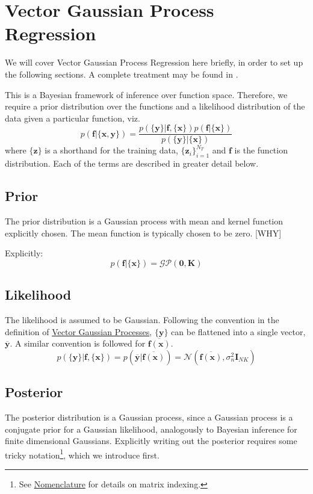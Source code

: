 \documentclass[12pt,a4paper,twoside]{report}
\theoremstyle{definition}
\begin{document}
\section{Vector Gaussian Process Regression}
We will cover Vector Gaussian Process Regression here briefly, in order to set up the following sections. A complete treatment may be found in \cite{alvarez}.

This is a Bayesian framework of inference over function space. Therefore, we require a prior distribution over the functions and a likelihood distribution of the data given a particular function, viz.
$$p(\mathbf f|\{\mathbf x,\mathbf y\}) = \frac{p(\{\mathbf y\}|\mathbf f,\{\mathbf x\})p(\mathbf f|\{\mathbf x\})}{p(\{\mathbf y\}|\{\mathbf x\})}$$
where $\{\mathbf z\}$ is a shorthand for the training data, $\{\mathbf z_i\}_{i=1}^{N_T}$ and $\mathbf f$ is the function distribution. Each of the terms are described in greater detail below.

\subsection{Prior}\label{prior}
The prior distribution is a Gaussian process with mean and kernel function explicitly chosen. The mean function is typically chosen to be zero. [WHY]

Explicitly:
$$p(\mathbf f|\{\mathbf x\}) = \mathcal {GP}(\mathbf 0,\mathbf K)$$

\subsection{Likelihood}\label{likelihood}
The likelihood is assumed to be Gaussian. Following the convention in the definition of \hyperref[vectorGP]{Vector Gaussian Processes}, $\{\mathbf y\}$ can be flattened into a single vector, $\mathbf{\overline y}$. A similar convention is followed for $\mathbf{\overline {f(\mathbf x)}}$.
$$ p(\{\mathbf y\}|\mathbf f, \{\mathbf x\}) = p\left(\mathbf{\overline y}| \mathbf{\overline {f(\mathbf x)}} \right) = \mathcal N(\mathbf{\overline {f(\mathbf x)}}, \sigma_n^2 \mathbf I_{NK}) $$

\subsection{Posterior}\label{posterior}
The posterior distribution is a Gaussian process, since a Gaussian process is a conjugate prior for a Gaussian likelihood, analogously to Bayesian inference for finite dimensional Gaussians. Explicitly writing out the posterior requires some tricky notation\footnote{See \hyperref[nomenclature]{Nomenclature} for details on matrix indexing.}, which we introduce first.
\end{document}
